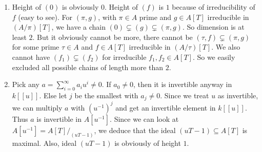 \newcommand{\sheet}{3}




\maketitle

\begin{exercise}{1}
    \begin{enumerate}
        \item Height of $(0)$ is obviously $0$. Height of $(f)$ is $1$ because
            of irreducibility of $f$ (easy to see).
            For $(\pi, g)$, with $\pi \in A$ prime and $g \in A[T]$ irreducible
            in $(A/\pi)[T]$, we have a chain $(0) \subsetneq (g) \subsetneq
            (\pi, g)$. So dimension is at least $2$. But it obviously cannot be
            more, there cannot be $(\tau, f) \subsetneq (\pi, g)$ for some prime
            $\tau \in A$ and $f \in A[T]$ irreducible in $(A/\tau)[T]$. We also
            cannot have $(f_1) \subsetneq (f_2)$ for irreducible $f_1, f_2 \in
            A[T]$. So we easily excluded all possible chains of length more than
            $2$.
        \item Pick any $a = \sum^{\infty}_{i=0} a_i u^i \not= 0$. If $a_0 \not=
            0$, then it is invertible anyway in $k[[u]]$. Else let $j$ be the
            smallest with $a_j \not= 0$. Since we treat $u$ as invertible, we
            can multiply $a$ with ${(u^{-1})}^j$ and get an invertible element
            in $k[[u]]$. Thus $a$ is invertible in $A[u^{-1}]$. Since we can
            look at $A[u^{-1}] = A[T] /_{(uT-1)}$, we deduce that the ideal
            $(uT-1) \subseteq A[T]$ is maximal. Also, ideal $(uT - 1)$ is
            obviously of height $1$.
    \end{enumerate}
\end{exercise}

